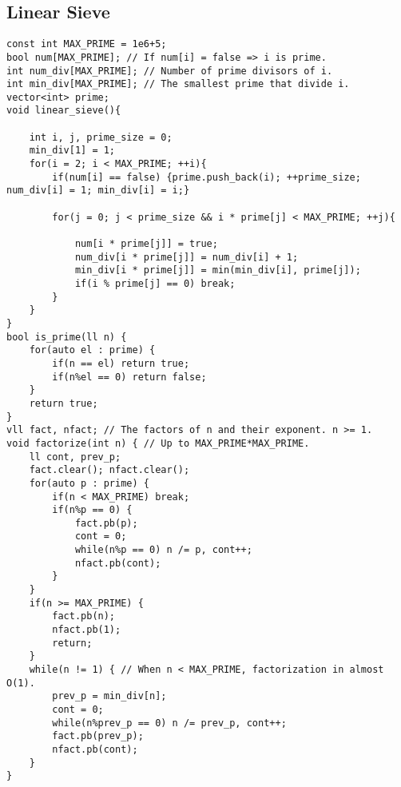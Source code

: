 \documentclass[a4paper]{article}
\begin{document}
\subsection*{Linear Sieve}
\begin{multicols}{2}
\begin{verbatim}
const int MAX_PRIME = 1e6+5;
bool num[MAX_PRIME]; // If num[i] = false => i is prime.
int num_div[MAX_PRIME]; // Number of prime divisors of i.
int min_div[MAX_PRIME]; // The smallest prime that divide i.
vector<int> prime;
void linear_sieve(){

    int i, j, prime_size = 0;
    min_div[1] = 1;
    for(i = 2; i < MAX_PRIME; ++i){
        if(num[i] == false) {prime.push_back(i); ++prime_size; num_div[i] = 1; min_div[i] = i;}
        
        for(j = 0; j < prime_size && i * prime[j] < MAX_PRIME; ++j){
        
            num[i * prime[j]] = true;
            num_div[i * prime[j]] = num_div[i] + 1;
            min_div[i * prime[j]] = min(min_div[i], prime[j]);
            if(i % prime[j] == 0) break;
        }
    }
}
bool is_prime(ll n) {
    for(auto el : prime) {
        if(n == el) return true;
        if(n%el == 0) return false;
    }
    return true;
}
vll fact, nfact; // The factors of n and their exponent. n >= 1.
void factorize(int n) { // Up to MAX_PRIME*MAX_PRIME.
    ll cont, prev_p;
    fact.clear(); nfact.clear();
    for(auto p : prime) {
        if(n < MAX_PRIME) break;
        if(n%p == 0) {
            fact.pb(p);
            cont = 0;
            while(n%p == 0) n /= p, cont++;
            nfact.pb(cont);
        }
    } 
    if(n >= MAX_PRIME) {
        fact.pb(n);
        nfact.pb(1);
        return;
    }
    while(n != 1) { // When n < MAX_PRIME, factorization in almost O(1).
        prev_p = min_div[n];
        cont = 0;
        while(n%prev_p == 0) n /= prev_p, cont++;
        fact.pb(prev_p);
        nfact.pb(cont);
    }
}
\end{verbatim}
\end{multicols}
\end{document}
